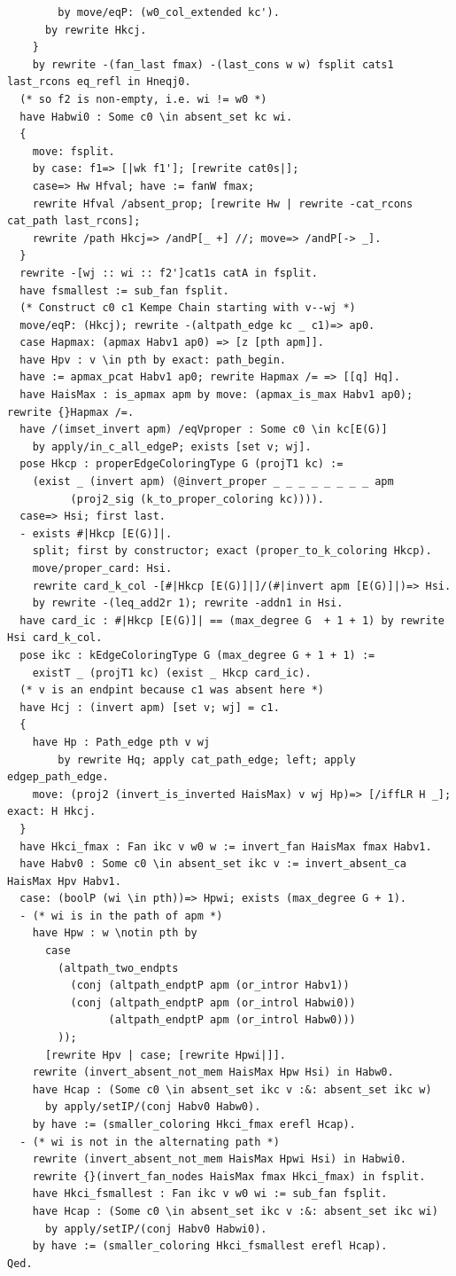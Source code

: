 \begin{verbatim}
        by move/eqP: (w0_col_extended kc').
      by rewrite Hkcj.
    }
    by rewrite -(fan_last fmax) -(last_cons w w) fsplit cats1 last_rcons eq_refl in Hneqj0.
  (* so f2 is non-empty, i.e. wi != w0 *)
  have Habwi0 : Some c0 \in absent_set kc wi.
  { 
    move: fsplit. 
    by case: f1=> [|wk f1']; [rewrite cat0s|]; 
    case=> Hw Hfval; have := fanW fmax;
    rewrite Hfval /absent_prop; [rewrite Hw | rewrite -cat_rcons cat_path last_rcons];
    rewrite /path Hkcj=> /andP[_ +] //; move=> /andP[-> _]. 
  }
  rewrite -[wj :: wi :: f2']cat1s catA in fsplit.
  have fsmallest := sub_fan fsplit.
  (* Construct c0 c1 Kempe Chain starting with v--wj *)
  move/eqP: (Hkcj); rewrite -(altpath_edge kc _ c1)=> ap0.
  case Hapmax: (apmax Habv1 ap0) => [z [pth apm]].
  have Hpv : v \in pth by exact: path_begin.
  have := apmax_pcat Habv1 ap0; rewrite Hapmax /= => [[q] Hq].
  have HaisMax : is_apmax apm by move: (apmax_is_max Habv1 ap0); rewrite {}Hapmax /=. 
  have /(imset_invert apm) /eqVproper : Some c0 \in kc[E(G)]
    by apply/in_c_all_edgeP; exists [set v; wj].
  pose Hkcp : properEdgeColoringType G (projT1 kc) :=  
    (exist _ (invert apm) (@invert_proper _ _ _ _ _ _ _ _ apm
          (proj2_sig (k_to_proper_coloring kc)))).
  case=> Hsi; first last.
  - exists #|Hkcp [E(G)]|.
    split; first by constructor; exact (proper_to_k_coloring Hkcp).
    move/proper_card: Hsi. 
    rewrite card_k_col -[#|Hkcp [E(G)]|]/(#|invert apm [E(G)]|)=> Hsi.
    by rewrite -(leq_add2r 1); rewrite -addn1 in Hsi.
  have card_ic : #|Hkcp [E(G)]| == (max_degree G  + 1 + 1) by rewrite Hsi card_k_col.
  pose ikc : kEdgeColoringType G (max_degree G + 1 + 1) := 
    existT _ (projT1 kc) (exist _ Hkcp card_ic).
  (* v is an endpint because c1 was absent here *)
  have Hcj : (invert apm) [set v; wj] = c1.
  {
    have Hp : Path_edge pth v wj 
        by rewrite Hq; apply cat_path_edge; left; apply edgep_path_edge.
    move: (proj2 (invert_is_inverted HaisMax) v wj Hp)=> [/iffLR H _]; exact: H Hkcj.
  }
  have Hkci_fmax : Fan ikc v w0 w := invert_fan HaisMax fmax Habv1.
  have Habv0 : Some c0 \in absent_set ikc v := invert_absent_ca HaisMax Hpv Habv1.
  case: (boolP (wi \in pth))=> Hpwi; exists (max_degree G + 1).
  - (* wi is in the path of apm *)
    have Hpw : w \notin pth by 
      case
        (altpath_two_endpts
          (conj (altpath_endptP apm (or_intror Habv1))
          (conj (altpath_endptP apm (or_introl Habwi0))
                (altpath_endptP apm (or_introl Habw0)))
        )); 
      [rewrite Hpv | case; [rewrite Hpwi|]].
    rewrite (invert_absent_not_mem HaisMax Hpw Hsi) in Habw0.
    have Hcap : (Some c0 \in absent_set ikc v :&: absent_set ikc w) 
      by apply/setIP/(conj Habv0 Habw0).
    by have := (smaller_coloring Hkci_fmax erefl Hcap).
  - (* wi is not in the alternating path *)
    rewrite (invert_absent_not_mem HaisMax Hpwi Hsi) in Habwi0.
    rewrite {}(invert_fan_nodes HaisMax fmax Hkci_fmax) in fsplit.
    have Hkci_fsmallest : Fan ikc v w0 wi := sub_fan fsplit.
    have Hcap : (Some c0 \in absent_set ikc v :&: absent_set ikc wi) 
      by apply/setIP/(conj Habv0 Habwi0).
    by have := (smaller_coloring Hkci_fsmallest erefl Hcap).
Qed.


\end{verbatim}
